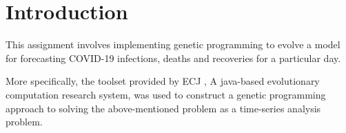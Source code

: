 \section{Introduction}
This assignment involves implementing genetic programming to evolve a model for forecasting COVID-19 infections, deaths and recoveries for a particular day.

More specifically, the toolset provided by ECJ \cite{luke2006ecj}, A java-based evolutionary computation research system, was used to construct a genetic programming approach to solving the above-mentioned problem as a time-series analysis problem.

